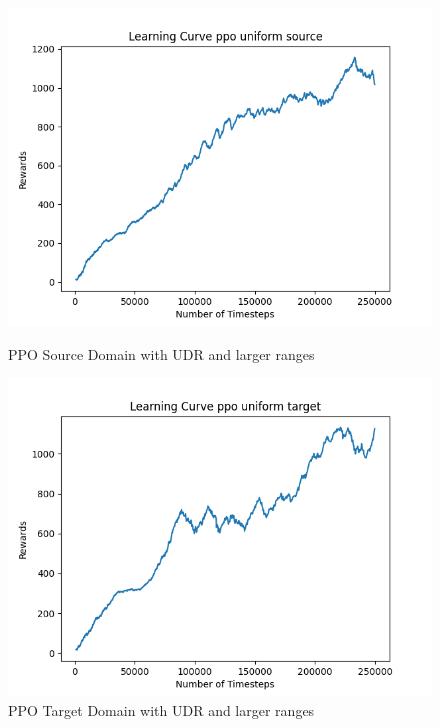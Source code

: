 \documentclass[11pt]{article}
\begin{document}
\begin{figure}[H]
\begin{minipage}{0.45\textwidth}
    \end{minipage}
    \vfill
    \begin{minipage}{0.45\textwidth}
        \centering
        \includegraphics[width=\textwidth]{../images/Learning_Curve_PPO_Uniform_Large_Source.png}
        \caption{PPO Source Domain with UDR and larger ranges}
        \label{fig:ppo_source_udr_larger}
    \end{minipage}
    \hfill
    \begin{minipage}{0.45\textwidth}
        \centering
        \includegraphics[width=\textwidth]{../images/Learning_Curve_PPO_Uniform_Large_Target.png}
        \caption{PPO Target Domain with UDR and larger ranges}
        \label{fig:ppo_target_udr_larger}
    \end{minipage}
\end{figure}
\end{document}
